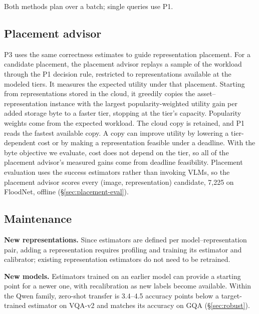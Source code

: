 Both methods plan over a batch; single queries use P1.

\subsection{Placement advisor}
\label{sec:advisor}

P3 uses the same correctness estimates to guide representation placement.
For a candidate placement, the placement advisor replays a sample of the workload
through the P1 decision rule, restricted to representations available at the
modeled tiers. It measures the expected utility under that placement. Starting
from representations stored in the cloud, it greedily copies the
asset--representation instance with the largest popularity-weighted utility
gain per added storage byte to a faster tier, stopping at the tier's capacity.
Popularity weights come from the expected workload. The cloud copy is
retained, and P1 reads the fastest available copy. A copy can improve utility
by lowering a tier-dependent cost or by making a representation feasible
under a deadline. With the byte objective we evaluate, cost does not depend on
the tier, so all of the placement advisor's measured gains come from deadline
feasibility. Placement evaluation uses the success estimators rather than
invoking VLMs, so the placement advisor scores every (image, representation) candidate,
7,225 on FloodNet, offline (\S\ref{sec:placement-eval}).

\subsection{Maintenance}

\textbf{New representations.} Since estimators are defined per
model--representation pair, adding a representation requires profiling and
training its estimator and calibrator; existing representation estimators do
not need to be retrained.

\textbf{New models.} Estimators trained on an earlier model can provide a
starting point for a newer one, with recalibration as new labels become
available. Within the Qwen family, zero-shot transfer is 3.4--4.5 accuracy
points below a target-trained estimator on VQA-v2 and matches its accuracy on
GQA (\S\ref{sec:robust}).

